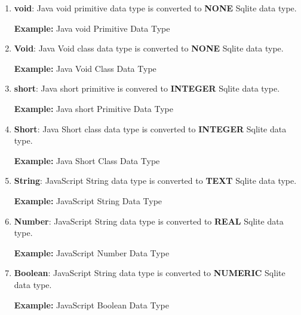 \begin{enumerate}
	\item \small \textbf{void}: Java void primitive data type is converted to \textbf{NONE} Sqlite data type.

		\par
		\textbf{Example:} Java void Primitive Data Type
			

	\item \small \textbf{Void}: Java Void class data type is converted to \textbf{NONE} Sqlite data type.

		\par
		\textbf{Example:} Java Void Class Data Type
			

	\item \small \textbf{short}: Java short primitive is convered to \textbf{INTEGER} Sqlite data type.

		\par
		\textbf{Example:} Java short Primitive Data Type
			

	\item \small \textbf{Short}: Java Short class data type is converted to \textbf{INTEGER} Sqlite data type.
		
		\par
		\textbf{Example:} Java Short Class Data Type
			


	\item \small \textbf{String}: JavaScript String data type is converted to \textbf{TEXT} Sqlite data type.

		\par 
		\textbf{Example:} JavaScript String Data Type
		 	


	\item \small \textbf{Number}: JavaScript String data type is converted to \textbf{REAL} Sqlite data type.

		\par 
		\textbf{Example:} JavaScript Number Data Type
		 	

	
	\item \small \textbf{Boolean}: JavaScript String data type is converted to \textbf{NUMERIC} Sqlite data type.

		\par 
		\textbf{Example:} JavaScript Boolean Data Type
		 	


\end{enumerate}


